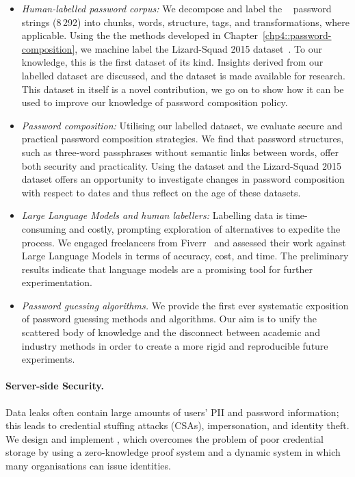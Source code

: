 \begin{itemize}
\item \textit{Human-labelled password corpus:} We decompose and label the ~\cite{miessler_hotmail_2009} password strings (8\,292) into chunks, words, structure, tags, and transformations, where applicable. Using the the methods developed in Chapter~\ref{chp4::password-composition}, we machine label the Lizard-Squad 2015 dataset~\cite{miessler_lizardsquad_2015}. To our knowledge, this is the first dataset of its kind. Insights derived from our labelled dataset are discussed, and the dataset is made available for research. This dataset in itself is a novel contribution, we go on to show how it can be used to improve our knowledge of password composition policy.

\item \textit{Password composition:} Utilising our labelled dataset, we evaluate secure and practical password composition strategies. We find that password structures, such as three-word passphrases without semantic links between words, offer both security and practicality. Using the  dataset and the Lizard-Squad 2015 dataset offers an opportunity to investigate changes in password composition with respect to dates and thus reflect on the age of these datasets. 

\item \textit{Large Language Models and human labellers:} Labelling data is time-consuming and costly, prompting exploration of alternatives to expedite the process. We engaged freelancers from Fiverr~\cite{fiverr2024} and assessed their work against Large Language Models in terms of accuracy, cost, and time. The preliminary results indicate that language models are a promising tool for further experimentation.

\item \textit{Password guessing algorithms.} We provide the first ever systematic exposition of password guessing methods and algorithms. Our aim is to unify the scattered body of knowledge and the disconnect between academic and industry methods in order to create a more rigid and reproducible future experiments.

\end{itemize}

\paragraph{Server-side Security.} Data leaks often contain large amounts of users’ PII and password information; this leads to credential stuffing attacks (CSAs), impersonation, and identity theft. We design and implement \deeid, which overcomes the problem of poor credential storage by using a zero-knowledge proof system and a dynamic system in which many organisations can issue identities.

